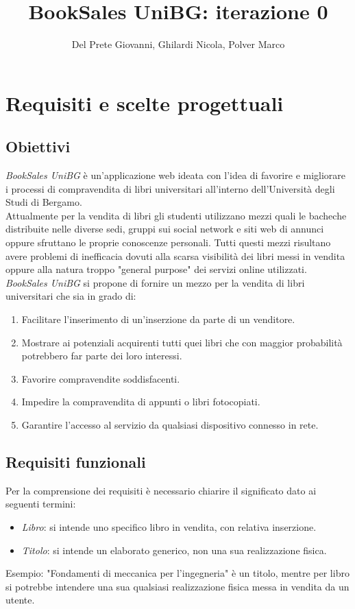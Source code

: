 \documentclass[10pt,a4paper]{report}
\author{Del Prete Giovanni, Ghilardi Nicola, Polver Marco}
\title{BookSales UniBG: iterazione 0}
\begin{document}
	
	\maketitle
	\tableofcontents
	
	\section{Requisiti e scelte progettuali}
	\subsection{Obiettivi}
	\textit{BookSales UniBG} è un'applicazione web ideata con l'idea di favorire e migliorare i processi di compravendita di libri universitari all'interno dell'Università degli Studi di Bergamo. 
	\\
	Attualmente per la vendita di libri gli studenti utilizzano mezzi quali le bacheche distribuite nelle diverse sedi, gruppi sui social network e siti web di annunci oppure sfruttano le proprie conoscenze personali. Tutti questi mezzi risultano avere problemi di inefficacia dovuti alla scarsa visibilità dei libri messi in vendita oppure alla natura troppo "general purpose" dei servizi online utilizzati.\\
	\textit{BookSales UniBG} si propone di fornire un mezzo per la vendita di libri universitari che sia in grado di:
	\begin{enumerate}
		\item Facilitare l'inserimento di un'inserzione da parte di un venditore.
		\item Mostrare ai potenziali acquirenti tutti quei libri che con maggior probabilità potrebbero far parte dei loro interessi.
		\item Favorire compravendite soddisfacenti.
		\item Impedire la compravendita di appunti o libri fotocopiati.
		\item Garantire l'accesso al servizio da qualsiasi dispositivo connesso in rete.
	\end{enumerate}

	\subsection{Requisiti funzionali}
	Per la comprensione dei requisiti è necessario chiarire il significato dato ai seguenti termini:
	\begin{itemize}
		\item \textit{Libro}: si intende uno specifico libro in vendita, con relativa inserzione.
		\item \textit{Titolo}: si intende un elaborato generico, non una sua realizzazione fisica.
	\end{itemize}
	Esempio: "Fondamenti di meccanica per l'ingegneria" è un titolo, mentre per libro si potrebbe intendere una sua qualsiasi realizzazione fisica messa in vendita da un utente. \\
	
\end{document}
